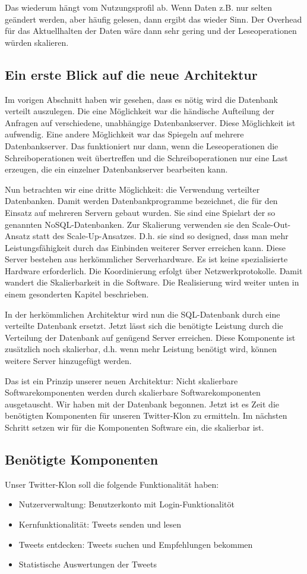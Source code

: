 Das wiederum hängt vom Nutzungsprofil ab. Wenn Daten z.B. nur selten geändert werden, aber häufig gelesen,
dann ergibt das wieder Sinn. Der Overhead für das Aktuellhalten der Daten wäre dann sehr gering und
der Leseoperationen würden skalieren. 

\subsection{Ein erste Blick auf die neue Architektur}
Im vorigen Abschnitt haben wir gesehen, dass es nötig wird die Datenbank verteilt auszulegen. Die eine Möglichkeit war
die händische Aufteilung der Anfragen auf verschiedene, unabhängige Datenbankserver. Diese Möglichkeit ist aufwendig.
Eine andere Möglichkeit war das Spiegeln auf mehrere Datenbankserver. Das funktioniert nur dann, wenn die Leseoperationen
die Schreiboperationen weit übertreffen und die Schreiboperationen nur eine Last erzeugen, die ein einzelner Datenbankserver
bearbeiten kann.

Nun betrachten wir eine dritte Möglichkeit: die Verwendung verteilter Datenbanken. Damit werden Datenbankprogramme
bezeichnet, die für den Einsatz auf mehreren Servern gebaut wurden. Sie sind eine Spielart der so genannten NoSQL-Datenbanken.
Zur Skalierung verwenden sie den Scale-Out-Ansatz statt des Scale-Up-Ansatzes. D.h. sie sind so designed, dass man mehr
Leistungsfähigkeit durch das Einbinden weiterer Server erreichen kann. Diese Server bestehen aus herkömmlicher Serverhardware.
Es ist keine spezialisierte Hardware erforderlich. Die Koordinierung erfolgt über Netzwerkprotokolle. Damit wandert die
Skalierbarkeit in die Software. Die Realisierung wird weiter unten in einem gesonderten Kapitel beschrieben.

In der herkömmlichen Architektur wird nun die SQL-Datenbank durch eine verteilte Datenbank ersetzt. Jetzt lässt sich
die benötigte Leistung durch die Verteilung der Datenbank auf genügend Server erreichen. Diese Komponente ist
zusätzlich noch skalierbar, d.h. wenn mehr Leistung benötigt wird, können weitere Server hinzugefügt werden.

Das ist ein Prinzip unserer neuen Architektur: Nicht skalierbare Softwarekomponenten werden durch skalierbare
Softwarekomponenten ausgetauscht. Wir haben mit der Datenbank begonnen. Jetzt ist es Zeit die benötigten Komponenten
für unseren Twitter-Klon zu ermitteln. Im nächsten Schritt setzen wir für die Komponenten Software ein, die skalierbar ist.

\subsection{Benötigte Komponenten}
Unser Twitter-Klon soll die folgende Funktionalität haben:
\begin{itemize}
  \item Nutzerverwaltung: Benutzerkonto mit Login-Funktionalitöt
  \item Kernfunktionalität: Tweets senden und lesen
  \item Tweets entdecken: Tweets suchen und Empfehlungen bekommen
  \item Statistische Auswertungen der Tweets
\end{itemize}

